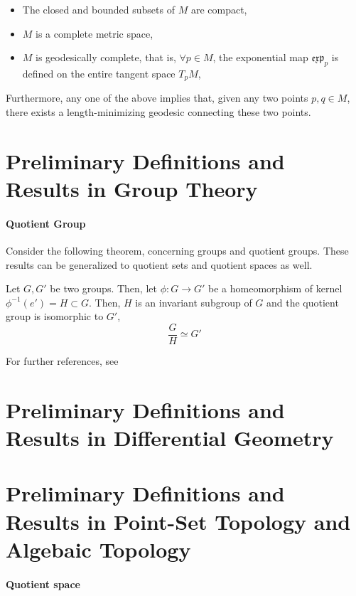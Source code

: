 \documentclass{homework}
\begin{document}
\begin{itemize}
    \item The closed and bounded subsets of $M$ are compact,
    \item $M$ is a complete metric space, 
    \item $M$ is geodesically complete, that is, $\forall p \in M$, the exponential map $\mathfrak{e}\mathfrak{x}\mathfrak{p}_{p}$ is defined on the entire tangent space $T_p M$,
\end{itemize}

Furthermore, any one of the above implies that, given any two points $p, q \in M$, there exists a length-minimizing geodesic connecting these two points. \\

\section{Preliminary Definitions and Results in Group Theory}

\paragraph{Quotient Group}

Consider the following theorem, concerning groups and quotient groups. These results can be generalized to quotient sets and quotient spaces as well. 

\begin{theorem} \label{Theorem_Quotient_Group}
      Let $G, G'$ be two groups. Then, let $\phi: G \rightarrow G'$ be a homeomorphism of kernel $\phi^{-1}(e') = H \subset G$. Then, $H$ is an invariant subgroup of $G$ and the quotient group is isomorphic to $G'$, 
      $$
        \frac{G}{H} \simeq G'
      $$
\end{theorem}

For further references, see \cite{HoracioII}

\section{Preliminary Definitions and Results in Differential Geometry}

\section{Preliminary Definitions and Results in Point-Set Topology and Algebaic Topology}

\paragraph{Quotient space}
\end{document}
